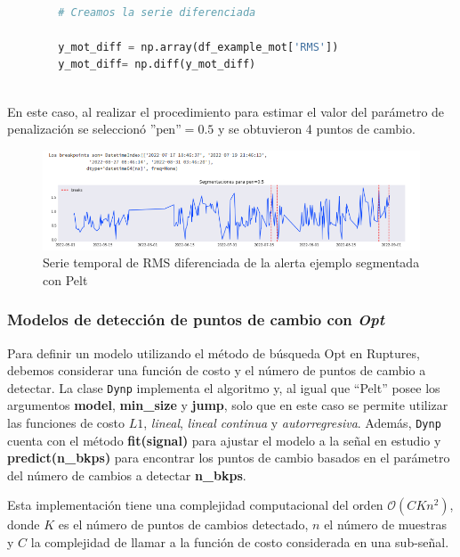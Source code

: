 \documentclass{article}[14pts]
\begin{document}
      \begin{lstlisting}[language=Python]

        # Creamos la serie diferenciada

        y_mot_diff = np.array(df_example_mot['RMS'])
        y_mot_diff= np.diff(y_mot_diff)
        
      \end{lstlisting}

    En este caso, al realizar el procedimiento para estimar el valor del parámetro de penalización se seleccionó  $\text{''pen''}= 0.5$ y se obtuvieron 4 puntos de cambio.

      \begin{center}
        \begin{figure}[h]
          \centering
          \includegraphics[width=.8\textwidth]{images/22.png}
          \caption{Serie temporal de RMS diferenciada de la alerta ejemplo segmentada con Pelt}
        \end{figure}    
      \end{center}
    
    \subsubsection{Modelos de detección de puntos de cambio con \textit{Opt}}

    Para definir un modelo utilizando el método de búsqueda Opt en Ruptures, debemos considerar una función de costo y el número de puntos de cambio a detectar. La clase \texttt{Dynp} implementa el algoritmo y, al igual que ``Pelt'' posee los argumentos \textbf{model}, \textbf{min\_size} y \textbf{jump}, solo que en este caso se permite utilizar las funciones de costo $L1$, \textit{lineal}, \textit{lineal continua} y \textit{autorregresiva}. Además, \texttt{Dynp} cuenta con el método \textbf{fit(signal)} para ajustar el modelo a la señal en estudio y \textbf{predict(n\_bkps)} para encontrar los puntos de cambio basados en el parámetro del número de cambios a detectar \textbf{n\_bkps}.

    Esta implementación tiene una complejidad computacional del orden $\mathcal{O}(CKn^2)$, donde $K$ es el número de puntos de cambios detectado, $n$ el número de muestras y $C$ la complejidad de llamar a la función de costo considerada en una sub-señal.
\end{document}

